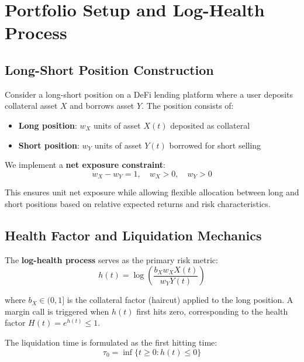 \documentclass{article}
\theoremstyle{definition}
\begin{document}
\section{Portfolio Setup and Log-Health Process}

\subsection{Long-Short Position Construction}

Consider a long-short position on a DeFi lending platform where a user deposits collateral asset $X$ and borrows asset $Y$. The position consists of:
\begin{itemize}
    \item \textbf{Long position}: $w_X$ units of asset $X(t)$ deposited as collateral
    \item \textbf{Short position}: $w_Y$ units of asset $Y(t)$ borrowed for short selling
\end{itemize}

We implement a \textbf{net exposure constraint}:
\begin{equation}
w_X - w_Y = 1, \quad w_X > 0, \quad w_Y > 0 \label{eq:net_exposure}
\end{equation}

This ensures unit net exposure while allowing flexible allocation between long and short positions based on relative expected returns and risk characteristics.

\subsection{Health Factor and Liquidation Mechanics}

The \textbf{log-health process} serves as the primary risk metric:
\begin{equation}
h(t) = \log\left( \frac{b_X w_X X(t)}{w_Y Y(t)} \right) \label{eq:log_health}
\end{equation}

where $b_X \in (0,1]$ is the collateral factor (haircut) applied to the long position. A margin call is triggered when $h(t)$ first hits zero, corresponding to the health factor $H(t) = e^{h(t)} \leq 1$.

The liquidation time is formulated as the first hitting time:
\begin{equation}
\tau_0 = \inf\{t \geq 0 : h(t) \leq 0\} \label{eq:liquidation_time}
\end{equation}
\end{document}
